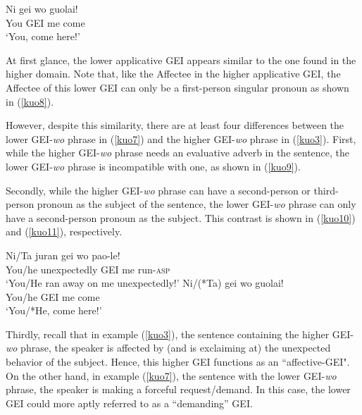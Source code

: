 \documentclass[output=paper,colorlinks,citecolor=brown]{langscibook}
\begin{document}
\ea
\label{kuo7}
\gll Ni     gei wo  guolai!\\  
     You    GEI me  come\\ 
\glt `You, come here!'
\z

At first glance, the lower applicative GEI appears similar to the one found in the higher domain. Note that, like the Affectee in the higher applicative GEI, the Affectee of this lower GEI can only be a first-person singular pronoun as shown in (\ref{kuo8}).

\z

However, despite this similarity, there are at least four differences between the lower GEI-\textit{wo} phrase in (\ref{kuo7}) and the higher GEI-\textit{wo} phrase in (\ref{kuo3}). First, while the higher GEI-\textit{wo} phrase needs an evaluative adverb in the sentence, the lower GEI-\textit{wo} phrase is incompatible with one, as shown in (\ref{kuo9}).

\z

Secondly, while the higher GEI-\textit{wo} phrase can have a second-person or third-person pronoun as the subject of the sentence, the lower GEI-\textit{wo} phrase can only have a second-person pronoun as the subject. This contrast is shown in (\ref{kuo10}) and (\ref{kuo11}), respectively.

\ea
\label{kuo10}
\gll Ni/Ta  juran           gei wo  pao-le!\\  
     You/he unexpectedly    GEI me  run-\textsc{asp}\\ 
\glt `You/He ran away on me unexpectedly!'
\ex
\label{kuo11}
\gll Ni/(*Ta)   gei wo  guolai!\\  
     You/he     GEI me  come\\ 
\glt `You/*He, come here!'
\z

Thirdly, recall that in example (\ref{kuo3}), the sentence containing the higher GEI-\textit{wo} phrase, the speaker is affected by (and is exclaiming at) the unexpected behavior of the subject. Hence, this higher GEI functions as an “affective-GEI". On the other hand, in example (\ref{kuo7}), the sentence with the lower GEI-\textit{wo} phrase, the speaker is making a forceful request/demand. In this case, the lower GEI could more aptly referred to as a ``demanding'' GEI.
\end{document}
